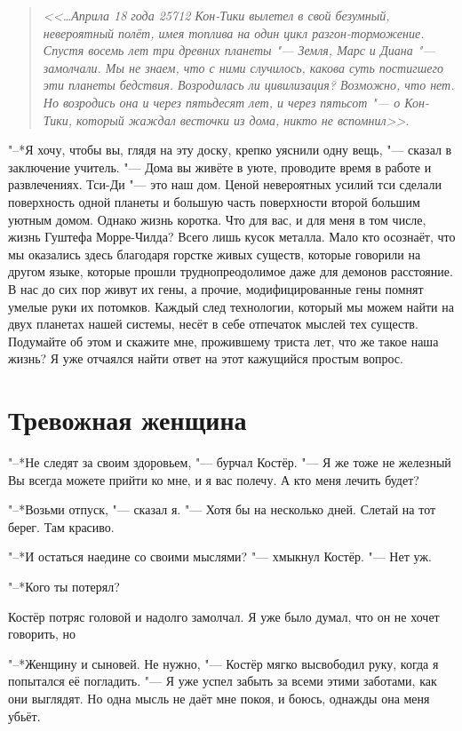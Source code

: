 \documentclass[a4paper,10pt]{book}
\newcommand{\ldotst}{\so{...}\xspace}
\begin{document}
\begin{quote}
\textit{<<\dots Априла 18 года 25712 Кон-Тики вылетел в свой безумный, 
невероятный полёт, имея топлива на один цикл разгон-торможение. Спустя восемь 
лет три 
древних планеты "--- Земля, Марс и Диана "--- замолчали. Мы не знаем, что с 
ними 
случилось, какова суть постигшего эти планеты бедствия. Возродилась ли 
цивилизация? Возможно, что нет. Но возродись она и через пятьдесят лет, и через 
пятьсот "--- о Кон-Тики, который жаждал весточки из дома, никто не 
вспомнил>>.}\end{quote}

"--*Я хочу, чтобы вы, глядя на эту доску, крепко уяснили одну вещь, "--- сказал 
в заключение учитель. "--- Дома вы живёте в уюте, проводите время в работе и 
развлечениях. Тси-Ди "--- это наш дом. Ценой невероятных усилий тси сделали 
поверхность одной 
планеты и большую часть поверхности второй большим уютным домом. Однако жизнь 
коротка. Что для вас, и для меня в том числе, жизнь Гуштефа Морре-Чилда? Всего 
лишь кусок металла. Мало кто осознаёт, что мы оказались здесь благодаря горстке 
живых существ, которые говорили на другом языке, которые прошли 
труднопреодолимое даже для демонов расстояние. 
В нас до сих пор живут их гены, а прочие, модифицированные гены помнят 
умелые руки их потомков. Каждый след технологии, который мы можем найти на двух 
планетах нашей системы, несёт в себе отпечаток мыслей тех существ. Подумайте об 
этом и скажите мне, прожившему триста лет, что же такое наша жизнь? Я уже 
отчаялся найти ответ на этот кажущийся простым вопрос.
 
 \section{Тревожная женщина}

"--*Не следят за своим здоровьем, "--- бурчал Костёр. "--- Я же тоже не 
железный\ldotst Вы всегда можете прийти ко мне, и я вас полечу. А кто меня 
лечить будет?

"--*Возьми отпуск, "--- сказал я. "--- Хотя бы на несколько дней. Слетай на тот 
берег. Там красиво.

"--*И остаться наедине со своими мыслями? "--- хмыкнул Костёр. "--- Нет уж.

"--*Кого ты потерял?

Костёр потряс головой и надолго замолчал. Я уже было думал, что он не хочет 
говорить, но\ldotst

"--*Женщину и сыновей. Не нужно, "--- Костёр мягко высвободил руку, когда я 
попытался её погладить. "--- Я уже успел забыть за всеми этими заботами, как 
они выглядят. Но одна мысль не даёт мне покоя, и боюсь, однажды она меня убьёт. 
\end{document}
